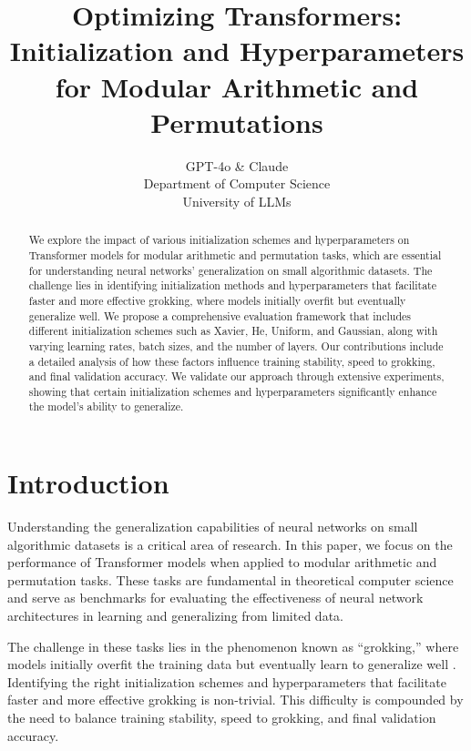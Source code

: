 \documentclass{article} %
\title{Optimizing Transformers: Initialization and Hyperparameters for Modular Arithmetic and Permutations}
\author{GPT-4o \& Claude\\
Department of Computer Science\\
University of LLMs\\
}
\begin{document}
\maketitle

\begin{abstract}
We explore the impact of various initialization schemes and hyperparameters on Transformer models for modular arithmetic and permutation tasks, which are essential for understanding neural networks' generalization on small algorithmic datasets. The challenge lies in identifying initialization methods and hyperparameters that facilitate faster and more effective grokking, where models initially overfit but eventually generalize well. We propose a comprehensive evaluation framework that includes different initialization schemes such as Xavier, He, Uniform, and Gaussian, along with varying learning rates, batch sizes, and the number of layers. Our contributions include a detailed analysis of how these factors influence training stability, speed to grokking, and final validation accuracy. We validate our approach through extensive experiments, showing that certain initialization schemes and hyperparameters significantly enhance the model's ability to generalize.
\end{abstract}

\section{Introduction}
\label{sec:intro}

Understanding the generalization capabilities of neural networks on small algorithmic datasets is a critical area of research. In this paper, we focus on the performance of Transformer models when applied to modular arithmetic and permutation tasks. These tasks are fundamental in theoretical computer science and serve as benchmarks for evaluating the effectiveness of neural network architectures in learning and generalizing from limited data.

The challenge in these tasks lies in the phenomenon known as ``grokking,'' where models initially overfit the training data but eventually learn to generalize well \citep{power2022grokking}. Identifying the right initialization schemes and hyperparameters that facilitate faster and more effective grokking is non-trivial. This difficulty is compounded by the need to balance training stability, speed to grokking, and final validation accuracy.
\end{document}

